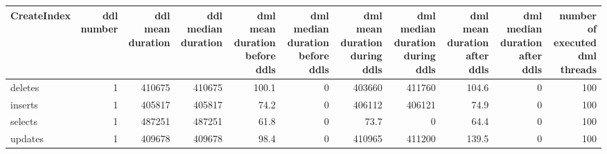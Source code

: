 \begin{tabular}{lrrrrrrrrrr}
\hline
 CreateIndex   &   ddl number &   ddl mean duration &   ddl median duration &   dml mean duration before ddls &   dml median duration before ddls &   dml mean duration during ddls &   dml median duration during ddls &   dml mean duration after ddls &   dml median duration after ddls &   number of executed dml threads \\
\hline
 deletes       &            1 &              410675 &                410675 &                           100.1 &                                 0 &                        403660   &                            411760 &                          104.6 &                                0 &                              100 \\
 inserts       &            1 &              405817 &                405817 &                            74.2 &                                 0 &                        406112   &                            406121 &                           74.9 &                                0 &                              100 \\
 selects       &            1 &              487251 &                487251 &                            61.8 &                                 0 &                            73.7 &                                 0 &                           64.4 &                                0 &                              100 \\
 updates       &            1 &              409678 &                409678 &                            98.4 &                                 0 &                        410965   &                            411200 &                          139.5 &                                0 &                              100 \\
\hline
\end{tabular}